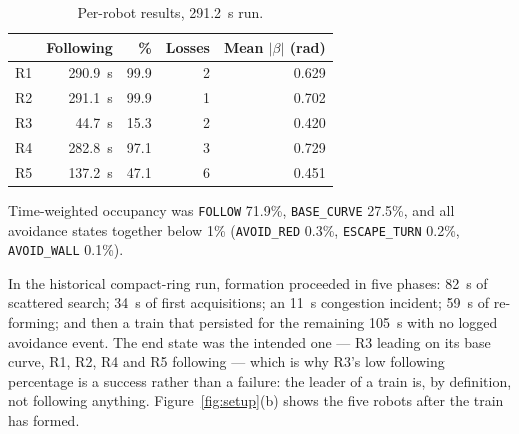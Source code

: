 \documentclass[conference,a4paper]{IEEEtran}
\begin{document}
\begin{table}[t]
\caption{Comparison of the two recorded observations. The worlds and starts
differ, so this is descriptive rather than a controlled comparison.}
\label{tab:comparison}
\centering
\footnotesize
{}
\end{table}

\begin{table}[t]
\caption{Per-robot results, \SI{291.2}{\second} run.}
\label{tab:results}
\centering
\footnotesize
\begin{tabular}{@{}lrrrr@{}}
\toprule
 & Following & \% & Losses & Mean $|\beta|$ (rad) \\
\midrule
R1 & \SI{290.9}{\second} & 99.9 & 2 & 0.629 \\
R2 & \SI{291.1}{\second} & 99.9 & 1 & 0.702 \\
R3 & \SI{44.7}{\second}  & 15.3 & 2 & 0.420 \\
R4 & \SI{282.8}{\second} & 97.1 & 3 & 0.729 \\
R5 & \SI{137.2}{\second} & 47.1 & 6 & 0.451 \\
\bottomrule
\end{tabular}
\end{table}

Time-weighted occupancy was \texttt{FOLLOW} 71.9\%, \texttt{BASE\_CURVE}
27.5\%, and all avoidance states together below 1\%
(\texttt{AVOID\_RED} 0.3\%, \texttt{ESCAPE\_TURN} 0.2\%,
\texttt{AVOID\_WALL} 0.1\%).

In the historical compact-ring run, formation proceeded in five phases:
\SI{82}{\second} of scattered search;
\SI{34}{\second} of first acquisitions; an \SI{11}{\second} congestion
incident; \SI{59}{\second} of re-forming; and then a train that persisted for
the remaining \SI{105}{\second} with no logged avoidance event. The end state
was the intended one --- R3 leading on its
base curve, R1, R2, R4 and R5 following --- which is why R3's low following
percentage is a success rather than a failure: the leader of a train is, by
definition, not following anything. Figure~\ref{fig:setup}(b) shows the five
robots after the train has formed.
\end{document}
